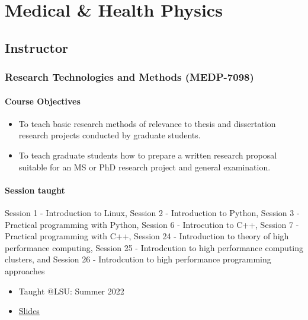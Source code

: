 \documentclass[11pt,a4paper]{article}
\begin{document}
\section*{Medical \& Health Physics}

\subsection*{Instructor}

\subsubsection*{Research Technologies and Methods (MEDP-7098)}

\paragraph{Course Objectives}

\begin{itemize}
\item To teach basic research methods of relevance to thesis and dissertation research projects conducted by graduate students.
\item To teach graduate students how to prepare a written research proposal suitable for an MS or PhD research project and general examination.
\end{itemize}

\paragraph{Session taught}

Session 1 - Introduction to Linux,  Session 2 - Introduction to Python,  Session 3 - Practical programming with Python,  Session 6 - Introcution to C++,   Session 7 - Practical programming with C++,  Session 24 - Introduction to theory of high performance computing,  Session 25 - Introdcution to high performance computing clusters,  and  Session 26 - Introdcution to high performance programming approaches

\begin{itemize}
\item Taught @LSU: Summer 2022
\item \href{https://github.com/diehlpkteaching/MEDP-7098}{Slides}
\end{itemize}
\end{document}
